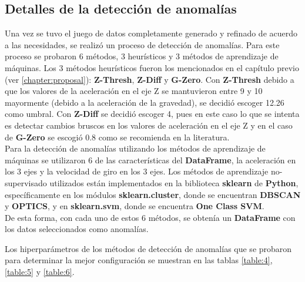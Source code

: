 	\subsection{Detalles de la detección de anomalías}
		Una vez se tuvo el juego de datos completamente generado y refinado de acuerdo a las necesidades, se realizó un proceso de detección de anomalías.
		Para este proceso se probaron 6 métodos, 3 heurísticos y 3 métodos de aprendizaje de máquinas. Los 3 métodos heurísticos fueron los mencionados 
		en el capítulo previo (ver \ref{chapter:proposal}): \textbf{Z-Thresh}, \textbf{Z-Diff} y \textbf{G-Zero}. Con \textbf{Z-Thresh} debido a que 
		los valores de la aceleración en el eje Z se mantuvieron entre 9 y 10 mayormente (debido a la aceleración de la gravedad), se decidió escoger
		12.26 como umbral. Con \textbf{Z-Diff} se decidió escoger 4, pues en este caso lo que se intenta es detectar cambios bruscos en los valores de
		aceleración en el eje Z y en el caso de \textbf{G-Zero} se escogió 0.8 como se recomienda en la literatura.\\
		\indent Para la detección de anomalías utilizando los métodos de aprendizaje de máquinas se utilizaron 6 de las características del \textbf
		{DataFrame}, la aceleración en los 3 ejes y la velocidad de giro en los 3 ejes. Los métodos de aprendizaje no-supervisado utilizados están
		implementados en la biblioteca \textbf{sklearn} de \textbf{Python}, específicamente en los módulos \textbf{sklearn.cluster}, donde se encuentran
		\textbf{DBSCAN} y \textbf{OPTICS}, y en \textbf{sklearn.svm}, donde se encuentra \textbf{One Class SVM}.\\
		\indent De esta forma, con cada uno de estos 6 métodos, se obtenía un \textbf{DataFrame} con los datos seleccionados como anomalías.

		Los hiperparámetros de los métodos de detección de anomalías que se probaron para determinar la mejor configuración se muestran en las tablas 
		\ref{table:4}, \ref{table:5} y \ref{table:6}.

